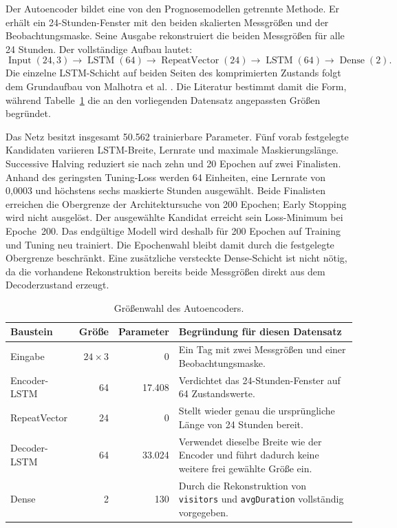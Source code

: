 Der Autoencoder bildet eine von den Prognosemodellen getrennte Methode. Er
erhält ein 24-Stunden-Fenster mit den beiden skalierten Messgrößen und der
Beobachtungsmaske. Seine Ausgabe rekonstruiert die beiden Messgrößen für alle
24 Stunden. Der vollständige Aufbau lautet:
\begin{equation}
 \operatorname{Input}(24,3) \rightarrow \operatorname{LSTM}(64)
 \rightarrow \operatorname{RepeatVector}(24)
 \rightarrow \operatorname{LSTM}(64)
 \rightarrow \operatorname{Dense}(2).
\end{equation}
Die einzelne LSTM-Schicht auf beiden Seiten des komprimierten Zustands folgt
dem Grundaufbau von Malhotra et al. \cite{malhotra2016encdec}. Die Literatur
bestimmt damit die Form, während Tabelle~\ref{tab:autoencoder_architektur} die
an den vorliegenden Datensatz angepassten Größen begründet.

Das Netz besitzt insgesamt 50.562 trainierbare Parameter. Fünf vorab
festgelegte Kandidaten variieren LSTM-Breite, Lernrate und maximale
Maskierungslänge. Successive Halving reduziert sie nach zehn und 20 Epochen
auf zwei Finalisten. Anhand des geringsten
Tuning-Loss werden 64 Einheiten, eine Lernrate von
0{,}0003 und höchstens sechs maskierte Stunden ausgewählt. Beide Finalisten
erreichen die Obergrenze der Architektursuche von 200 Epochen; Early Stopping
wird nicht ausgelöst. Der ausgewählte Kandidat erreicht sein Loss-Minimum bei
Epoche~200. Das endgültige Modell wird deshalb für 200 Epochen auf Training und
Tuning neu trainiert. Die Epochenwahl bleibt damit durch die festgelegte
Obergrenze beschränkt. Eine
zusätzliche versteckte Dense-Schicht ist nicht nötig, da die vorhandene
Rekonstruktion bereits beide Messgrößen direkt aus dem Decoderzustand erzeugt.

\begin{table}[htb]
  \centering
  \small
  \caption{Größenwahl des Autoencoders.}
  \label{tab:autoencoder_architektur}
  \begin{tabularx}{\textwidth}{lrrX}
    \hline
    Baustein & Größe & Parameter & Begründung für diesen Datensatz \\
    \hline
    Eingabe & $24\times3$ & 0 & Ein Tag mit zwei Messgrößen und einer
      Beobachtungsmaske. \\
    Encoder-LSTM & 64 & 17.408 & Verdichtet das 24-Stunden-Fenster auf 64
      Zustandswerte. \\
    RepeatVector & 24 & 0 & Stellt wieder genau die ursprüngliche Länge von
      24 Stunden bereit. \\
    Decoder-LSTM & 64 & 33.024 & Verwendet dieselbe Breite wie der Encoder und
      führt dadurch keine weitere frei gewählte Größe ein. \\
    Dense & 2 & 130 & Durch die Rekonstruktion von \texttt{visitors} und
      \texttt{avgDuration} vollständig vorgegeben. \\
    \hline
  \end{tabularx}
\end{table}
\FloatBarrier

